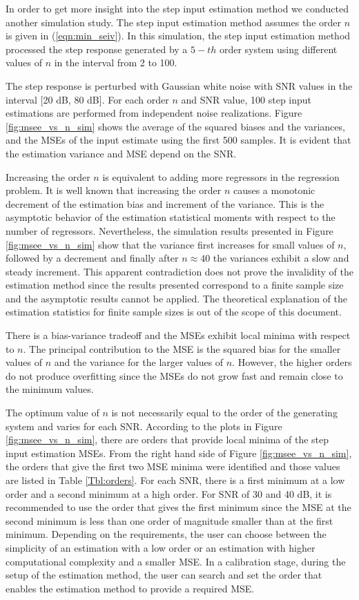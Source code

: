 In order to get more insight into the step input estimation method we conducted another simulation study. 
The step input estimation method assumes the order $n$ is given in (\ref{eqn:min_seiv}).
In this simulation, the step input estimation method processed the step response generated by a $5-th$ order system using different values of $n$ in the interval from 2 to 100.

The step response is perturbed with Gaussian white noise with SNR values in the interval [20 dB, 80 dB].
For each order $n$ and SNR value, 100 step input estimations are performed from independent noise realizations. 
Figure \ref{fig:msee_vs_n_sim} shows the average of the squared biases and the variances, and the MSEs of the input estimate using the first 500 samples.
It is evident that the estimation variance and MSE depend on the SNR.

Increasing the order $n$ is equivalent to adding more regressors in the regression problem.
It is well known that increasing the order $n$ causes a monotonic decrement of the estimation bias and increment of the variance.
This is the asymptotic behavior of the estimation statistical moments with respect to the number of regressors.
Nevertheless, the simulation results presented in Figure \ref{fig:msee_vs_n_sim} show that the variance first increases for small values of $n$, followed by a decrement and finally after $n \approx 40$ the variances exhibit a slow and steady increment. 
This apparent contradiction does not prove the invalidity of the estimation method since the results presented correspond to a finite sample size and the asymptotic results cannot be applied.
The theoretical explanation of the estimation statistics for finite sample sizes is out of the scope of this document.

 
There is a bias-variance tradeoff and the MSEs exhibit local minima with respect to $n$.
The principal contribution to the MSE is the squared bias for the smaller values of $n$ and the variance for the larger values of $n$. 
However, the higher orders do not produce overfitting since the MSEs do not grow fast and remain close to the minimum values. 

The optimum value of $n$ is not necessarily equal to the order of the generating system and varies for each SNR.
According to the plots in Figure \ref{fig:msee_vs_n_sim}, there are orders that provide local minima of the step input estimation MSEs.
From the right hand side of Figure \ref{fig:msee_vs_n_sim}, the orders that give the first two MSE minima were identified and those values are listed in Table \ref{Tbl:orders}.
For each SNR, there is a first minimum at a low order and a second minimum at a high order.
For SNR of 30 and 40 dB, it is recommended to use the order that gives the first minimum since the MSE at the second minimum is less than one order of magnitude smaller than at the first minimum.
Depending on the requirements, the user can choose between the simplicity of an estimation with a low order or an estimation with higher computational complexity and a smaller MSE. 
In a calibration stage, during the setup of the estimation method, the user can search and set the order that enables the estimation method to provide a required MSE.



